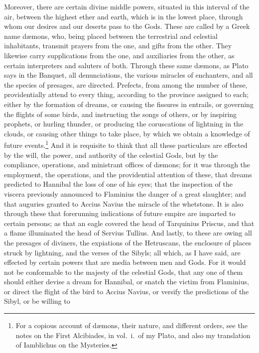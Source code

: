 \documentclass[12pt]{article}
\begin{document}
Moreover, there are certain divine middle powers, situated in this interval of
the air, between the highest ether and earth, which is in the lowest place,
through whom our desires and our deserts pass to the Gods.  These are called by
a Greek name d{\ae}mons, who, being placed between the terrestrial and
celestial inhabitants, transmit prayers from the one, and gifts from the other.
They likewise carry supplications from the one, and auxiliaries from the other,
as certain interpreters and saluters of both. Through these same d{\ae}mons, as
Plato says in the Banquet, all denunciations, the various miracles of
enchanters, and all the species of presages, are directed.  Prefects, from
among the number of these, providentially attend to every thing, according to
the province assigned to each; either by the formation of dreams, or causing
the fissures in entrails, or governing the flights of some birds, and
instructing the songs of others, or by inspiring prophets, or hurling thunder,
or producing the coruscations of lightning in the clouds, or causing other
things to take place, by which we obtain a knowledge of future
events.\footnote{For a copious account of d{\ae}mons, their nature, and
different orders, see the notes on the First Alcibiades, in vol.~i.~of
my Plato, and also my translation of Iamblichus on the
Mysteries.} And it is requisite to think that all these particulars are
effected by the will, the power, and authority of the celestial Gods, but by
the compliance, operations, and ministrant offices of d{\ae}mons; for it was
through the employment, the operations, and the providential attention of
these, that dreams predicted to Hannibal the loss of one of his eyes; that the
inspection of the viscera previously announced to Flaminius the danger of a
great slaughter; and that auguries granted to Accius Navius the miracle of the
whetstone. It is also through these that forerunning indications of future
empire are imparted to certain persons; as that an eagle covered the head of
Tarquinius Priscus, and that a flame illuminated the head of Servius Tullius.
And lastly, to these are owing all the presages of diviners, the expiations of
the Hetruscans, the enclosure of places struck by lightning, and the verses of
the Sibyls; all which, as I have said, are effected by certain powers that are
media between men and Gods.  For it would not be conformable to the majesty of
the celestial Gods, that any one of them should either devise a dream for
Hannibal, or snatch the victim from Flaminius, or direct the flight of the bird
to Accius Navius, or versify the predictions of the Sibyl, or be willing to
\end{document}
